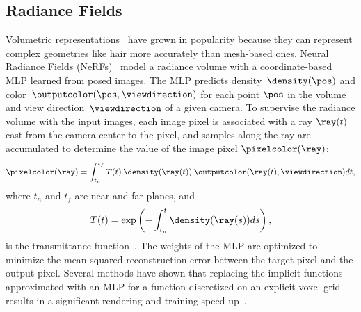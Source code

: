   \subsection{Radiance Fields}
    Volumetric representations~\cite{vicini2021nonexponential} have grown in
    popularity because they can represent complex geometries like hair more
    accurately than mesh-based ones.
    Neural Radiance Fields (NeRFs)~\cite{mildenhall2020nerf} model a radiance
    volume with a coordinate-based MLP learned from posed images.
    The MLP predicts density~$\density(\pos)$ and color~$\outputcolor(\pos,
      \viewdirection)$ for each point $\pos$ in the volume and view
    direction~$\viewdirection$ of a given camera.
    To supervise the radiance volume with the input images, each image pixel is associated with a ray $\ray(t)$ cast from the camera center to the pixel, and samples along the ray are accumulated to determine the value of the image pixel $\pixelcolor(\ray)$:
    \begin{equation}
      \label{eq:blendfields-rendering-equation}
      \pixelcolor(\ray)=\int^{t_f}_{t_n}T(t)\:\density(\ray(t))\:\outputcolor(\ray(t), \viewdirection)dt,
    \end{equation}
    where $t_n$ and $t_f$ are near and far planes, and
    \begin{equation}
      T(t) = \exp\left(-\int^t_{t_n}\density(\ray(s))ds\right) , \end{equation} is
    the transmittance function~\cite{tagliasacchi2022volume}.
    The weights of the MLP are optimized to minimize the mean squared
    reconstruction error between the target pixel and the output pixel.
    Several methods have shown that replacing the implicit functions approximated
    with an MLP for a function discretized on an explicit voxel grid results in a
    significant rendering and training speed-up~\cite{garbin2021fastnerf,
      hedman2021baking, yu2021plenoctrees, sun2021direct, liu2020neural}.

